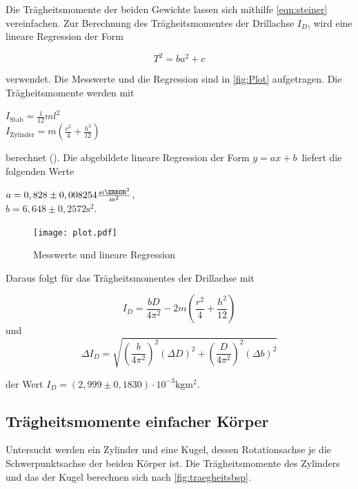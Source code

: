 Die Trägheitsmomente der beiden Gewichte lassen sich mithilfe \autoref{eqn:steiner} vereinfachen. Zur Berechnung
des Trägheitsmomentes der Drillachse $I_D$, wird eine lineare Regression der Form

\begin{equation}
  \label{eqn:linReg}
  T^2 = ba^2+c
\end{equation}


verwendet.
Die Messwerte und die Regression sind in \autoref{fig:Plot} aufgetragen. Die Trägheitsmomente werden mit
\begin{center}
  $I_{\text{Stab}} = \frac{1}{12} ml^2 $ \\
  $I_{\text{Zylinder}} = m (\frac{r^2}{4} +\frac{h^2}{12}) $ \\
\end{center}
berechnet (\cite{Anleitung}).
Die abgebildete lineare Regression der Form $ y = ax + b \,$ liefert die folgenden Werte

\begin{center}
  $ a = 0,828 \pm 0,008254 \frac{si{\s^2}}{\si{\m^2}}$, \\
  $ b = 6,648 \pm 0,2572 \si{\s^2}$. \\
\end{center}

\begin{figure}[H]
  \centering
  \texttt{[image: plot.pdf]}
  \caption{Messwerte und lineare Regression}
  \label{fig:Plot}
\end{figure}


Daraus folgt für das Trägheitsmomentes der Drillachse mit

\begin{equation*}
  I_D = \frac{bD}{4 \pi ^2} - 2m (\frac{r^2}{4} + \frac{h^2}{12})
\end{equation*}
und
\begin{equation*}
  \Delta I_D = \sqrt{(\frac{b}{4 \pi ^2})^2  (\Delta D)^2 + (\frac{D}{4 \pi ^2})^2  (\Delta b)^2}
\end{equation*}

der Wert $I_D = (2,999 \pm 0,1830) \cdot 10^{-3} \si{\kilogram\meter^2} $.

\subsection{Trägheitsmomente einfacher Körper}
\label{sec:Trägheitsmomente einfacher Körper}

Untersucht werden ein Zylinder und eine Kugel, dessen Rotationsachse je die Schwerpunktsachse der beiden Körper ist.
Die Trägheitsmomente des Zylinders und das der Kugel berechnen sich nach \autoref{fig:traegheitsbsp}.


